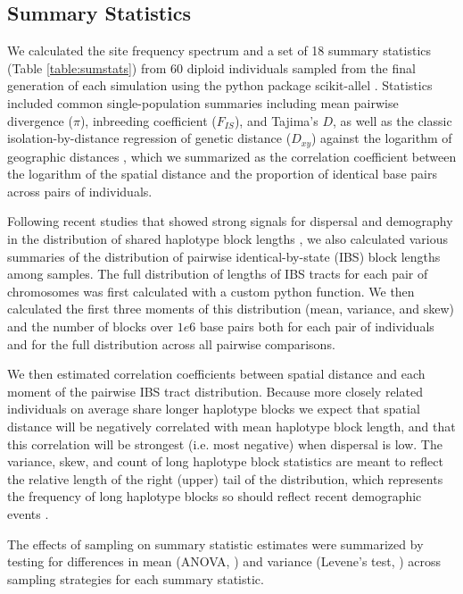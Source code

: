 \documentclass[11pt,twoside,lineno]{preprint}
\begin{document}
\subsection{Summary Statistics}
We calculated the site frequency spectrum and a set of 18 summary statistics (Table \ref{table:sumstats}) from 60 diploid individuals sampled from the final generation of each simulation using the python package scikit-allel \citep{Miles2017}. 
Statistics included common single-population summaries including mean pairwise divergence ($\pi$), inbreeding coefficient ($F_{IS}$), and Tajima's $D$, 
as well as the classic isolation-by-distance regression of genetic distance ($D_{xy}$) against the logarithm of geographic distances \citep{Rousset1997}, 
which we summarized as the correlation coefficient between the logarithm of the spatial distance and the proportion of identical base pairs across pairs of individuals. 

Following recent studies that showed strong signals for dispersal and demography in the distribution of shared haplotype block lengths \citep{Ringbauer2017,Baharian2016}, we also calculated various summaries of the distribution of pairwise identical-by-state (IBS) block lengths among samples. The full distribution of lengths of IBS tracts for each pair of chromosomes was first calculated with a custom python function. 
We then calculated the first three moments of this distribution (mean, variance, and skew) and the number of blocks over $1e6$ base pairs both for each pair of individuals and for the full distribution across all pairwise comparisons. 

We then estimated correlation coefficients between spatial distance and each moment of the pairwise IBS tract distribution. Because more closely related individuals on average share longer haplotype blocks we expect that spatial distance will be negatively correlated with mean haplotype block length, and that this correlation will be strongest (i.e. most negative) when dispersal is low. The variance, skew, and count of long haplotype block statistics are meant to reflect the relative length of the right (upper) tail of the distribution, which represents the frequency of long haplotype blocks so should reflect recent demographic events \citep{chapman2002effect}. 

The effects of sampling on summary statistic estimates were summarized by testing for differences in mean (ANOVA, \citep{Rcore2018}) and variance (Levene's test, \citep{Fox2011}) across sampling strategies for each summary statistic. 
\end{document}
